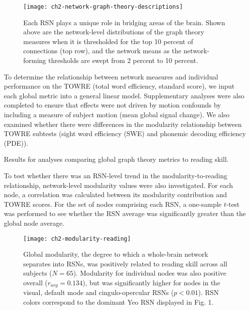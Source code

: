 \begin{figure}[t]
    \centering
    \texttt{[image: ch2-network-graph-theory-descriptions]}
    \caption[Relationships between network-level graph theory measures.]{Each RSN plays a unique role in bridging areas of the brain. Shown above are the network-level distributions of the graph theory measures when it is thresholded for the top 10 percent of connections (top row), and the network means as the network-forming thresholds are swept from 2 percent to 10 percent.}
    \label{fig:ch2-network-graph-theory-descriptions}
\end{figure}

To determine the relationship between network measures and individual performance on the TOWRE (total word efficiency, standard score), we input each global metric into a general linear model. Supplementary analyses were also completed to ensure that effects were not driven by motion confounds by including a measure of subject motion (mean global signal change). We also examined whether there were differences in the modularity relationship between TOWRE subtests (sight word efficiency (SWE) and phonemic decoding efficiency (PDE)).

\begin{table}
	\renewcommand{\tabcolsep}{0.09cm}
	\centering
	
	\caption{Results for analyses comparing global graph theory metrics to reading skill.}
	\label{table:ch2-global-glm-results}
\end{table}

To test whether there was an RSN-level trend in the modularity-to-reading relationship, network-level modularity values were also investigated. For each node, a correlation was calculated between its modularity contribution and TOWRE scores. For the set of nodes comprising each RSN, a one-sample $t$-test was performed to see whether the RSN average was significantly greater than the global node average. 

\begin{figure}[t]
    \centering
    \texttt{[image: ch2-modularity-reading]}
    \caption[Modularity metrics at rest predict reading skill.] {Global modularity, the degree to which a whole-brain network separates into RSNs, was positively related to reading skill across all subjects ($N = 65$). Modularity for individual nodes was also positive overall ($r_{avg} = 0.134$), but was significantly higher for nodes in the visual, default mode and cingulo-opercular RSNs ($p < 0.01$). RSN colors correspond to the dominant Yeo RSN displayed in Fig. 1.}
    \label{fig:ch2-modularity-reading}
\end{figure}

